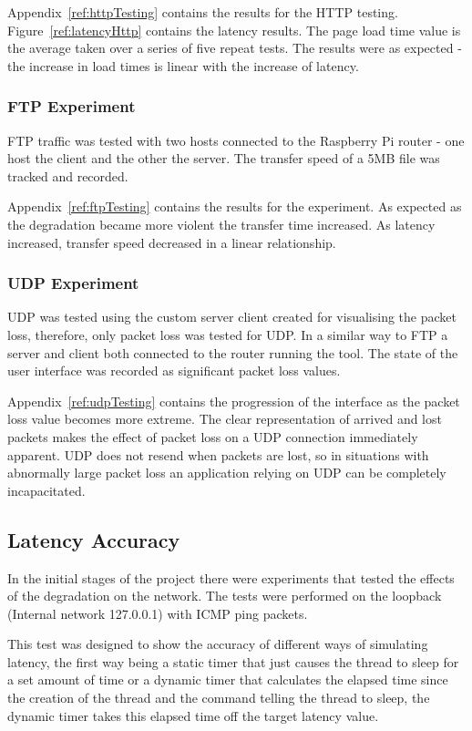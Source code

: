 Appendix~\ref{ref:httpTesting} contains the results for the HTTP testing. Figure~\ref{ref:latencyHttp} contains the latency results. The page load time value is the average taken over a series of five repeat tests. The results were as expected - the increase in load times is linear with the increase of latency.


\subsubsection{FTP Experiment}
FTP traffic was tested with two hosts connected to the Raspberry Pi router - one host the client and the other the server. The transfer speed of a 5MB file was tracked and recorded.

Appendix~\ref{ref:ftpTesting} contains the results for the experiment. As expected as the degradation became more violent the transfer time increased. As latency increased, transfer speed decreased in a linear relationship.

\subsubsection{UDP Experiment}
UDP was tested using the custom server client created for visualising the packet loss, therefore, only packet loss was tested for UDP. In a similar way to FTP a server and client both connected to the router running the tool. The state of the user interface was recorded as significant packet loss values.

Appendix~\ref{ref:udpTesting} contains the progression of the interface as the packet loss value becomes more extreme. The clear representation of arrived and lost packets makes the effect of packet loss on a UDP connection immediately apparent. UDP does not resend when packets are lost, so in situations with abnormally large packet loss an application relying on UDP can be completely incapacitated.

\subsection{Latency Accuracy}
In the initial stages of the project there were experiments that tested the effects of the degradation on the network. The tests were performed on the loopback (Internal network 127.0.0.1) with ICMP ping packets.

This test was designed to show the accuracy of different ways of simulating latency, the first way being a static timer that just causes the thread to sleep for a set amount of time or a dynamic timer that calculates the elapsed time since the creation of the thread and the command telling the thread to sleep, the dynamic timer takes this elapsed time off the target latency value.

